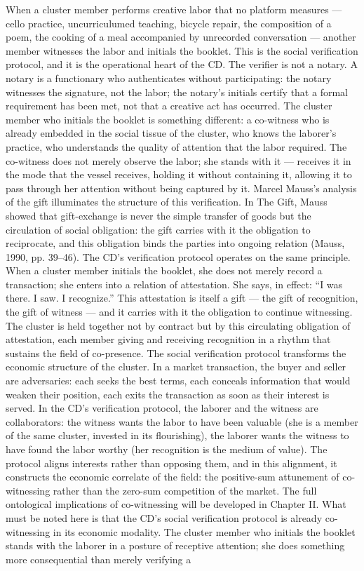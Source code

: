 When a cluster member performs creative labor that no platform measures — cello practice, uncurriculumed teaching, bicycle repair, the composition of a poem, the cooking of a meal accompanied by unrecorded conversation — another member witnesses the labor and initials the booklet. This is the social verification protocol, and it is the operational heart of the CD. The verifier is not a notary. A notary is a functionary who authenticates without participating: the notary witnesses the signature, not the labor; the notary’s initials certify that a formal requirement has been met, not that a creative act has occurred. The cluster member who initials the booklet is something different: a co-witness who is already embedded in the social tissue of the cluster, who knows the laborer’s practice, who understands the quality of attention that the labor required. The co-witness does not merely observe the labor; she stands with it — receives it in the mode that the vessel receives, holding it without containing it, allowing it to pass through her attention without being captured by it. Marcel Mauss’s analysis of the gift illuminates the structure of this verification. In The Gift, Mauss showed that gift-exchange is never the simple transfer of goods but the circulation of social obligation: the gift carries with it the obligation to reciprocate, and this obligation binds the parties into ongoing relation (Mauss, 1990, pp. 39–46). The CD’s verification protocol operates on the same principle. When a cluster member initials the booklet, she does not merely record a transaction; she enters into a relation of attestation. She says, in effect: “I was there. I saw. I recognize.” This attestation is itself a gift — the gift of recognition, the gift of witness — and it carries with it the obligation to continue witnessing. The cluster is held together not by contract but by this circulating obligation of attestation, each member giving and receiving recognition in a rhythm that sustains the field of co-presence. The social verification protocol transforms the economic structure of the cluster. In a market transaction, the buyer and seller are adversaries: each seeks the best terms, each conceals information that would weaken their position, each exits the transaction as soon as their interest is served. In the CD’s verification protocol, the laborer and the witness are collaborators: the witness wants the labor to have been valuable (she is a member of the same cluster, invested in its flourishing), the laborer wants the witness to have found the labor worthy (her recognition is the medium of value). The protocol aligns interests rather than opposing them, and in this alignment, it constructs the economic correlate of the field: the positive-sum attunement of co-witnessing rather than the zero-sum competition of the market. The full ontological implications of co-witnessing will be developed in Chapter II. What must be noted here is that the CD’s social verification protocol is already co-witnessing in its economic modality. The cluster member who initials the booklet stands with the laborer in a posture of receptive attention; she does something more consequential than merely verifying a

